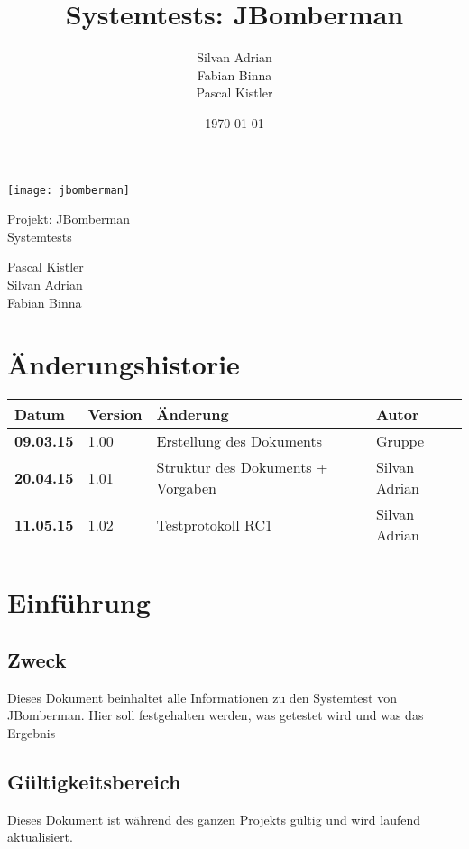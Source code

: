\documentclass[11pt]{scrartcl}
\title{Systemtests: JBomberman}
\author{Silvan Adrian \\ Fabian Binna \\ Pascal Kistler}
\date{\today{}}
\begin{document}
\def\arraystretch{1.5}
\begin{titlepage}
\begin{center}
\vspace{10em}
\texttt{[image: jbomberman]}
\vspace{10em}
\end{center}
\begin{center}
\huge {Projekt: JBomberman} \\
\huge {Systemtests}
\end{center}
\begin{center}
\vspace{10em}
\LARGE {Pascal Kistler} \\
\LARGE {Silvan Adrian} \\
\LARGE {Fabian Binna}
\end{center}

\end{titlepage}

\newpage
\section{Änderungshistorie}
\label{sec:Änderungen}

\begin{tabularx}{\linewidth}{l l l l}
\textbf{Datum} & \textbf{Version} & \textbf{Änderung}  & \textbf{Autor} \\
\hline
\textbf{09.03.15} & 1.00 & Erstellung des Dokuments & Gruppe \\
\textbf{20.04.15} & 1.01 & Struktur des Dokuments + Vorgaben & Silvan Adrian \\
\textbf{11.05.15} & 1.02 & Testprotokoll RC1 & Silvan Adrian \\
\end{tabularx}

\newpage
\tableofcontents
\newpage
\section{Einführung}
\subsection{Zweck}
Dieses Dokument beinhaltet alle Informationen zu den Systemtest von JBomberman.
Hier soll festgehalten werden, was getestet wird und was das Ergebnis
\subsection{Gültigkeitsbereich}
Dieses Dokument ist während des ganzen Projekts gültig und wird laufend aktualisiert.
\end{document}
